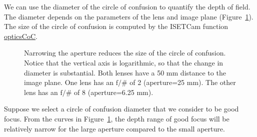 \documentclass[
  letterpaper,
]{book}
\begin{document}
We can use the diameter of the circle of confusion to quantify the depth
of field. The diameter depends on the parameters of the lens and image
plane (Figure~\ref{fig-optics-coc3}). The size of the circle of
confusion is computed by the ISETCam function
\href{https://github.com/iset/ISETCam/blob/main/opticalimage/optics/opticsCoC.m}{opticsCoC}.

\begin{figure}


\caption{\label{fig-optics-coc3}Narrowing the aperture reduces the size
of the circle of confusion. Notice that the vertical axis is
logarithmic, so that the change in diameter is substantial. Both lenses
have a 50 mm distance to the image plane. One lens has an
\(\mathrm{f}/\#\) of 2 (aperture=25 mm). The other lens has an
\(\mathrm{f}/\#\) of 8 (aperture=6.25 mm).}

\end{figure}%

Suppose we select a circle of confusion diameter that we consider to be
good focus. From the curves in Figure~\ref{fig-optics-coc3}, the depth
range of good focus will be relatively narrow for the large aperture
compared to the small aperture.
\end{document}
